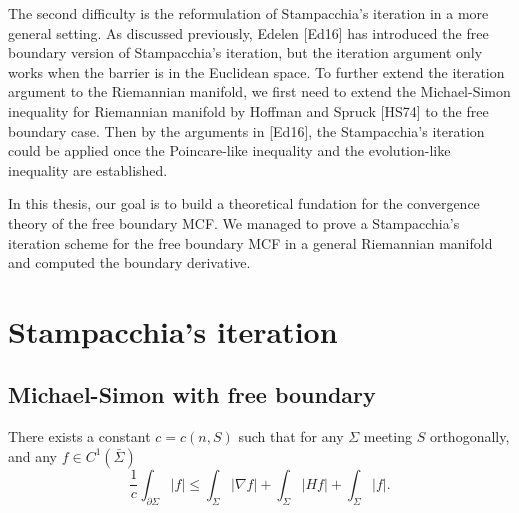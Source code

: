 The second difficulty is the reformulation of Stampacchia's iteration in a more general setting. As discussed previously, Edelen [Ed16] has introduced the free boundary version of Stampacchia's iteration, but the iteration argument only works when the barrier is in the Euclidean space. To further extend the iteration argument to the Riemannian manifold, we first need to extend the Michael-Simon inequality for Riemannian manifold by Hoffman and Spruck [HS74] to the free boundary case. Then by the arguments in [Ed16], the Stampacchia's iteration could be applied once the Poincare-like inequality and the evolution-like inequality are established.

In this thesis, our goal is to build a theoretical fundation for the convergence theory of the free boundary MCF. We managed to prove a Stampacchia's iteration scheme for the free boundary MCF in a general Riemannian manifold and computed the boundary derivative.

\section{Stampacchia's iteration}
\subsection{Michael-Simon with free boundary}

\begin{lemma}\label{BoundaryIntegral}
    There exists a constant $c=c(n,S)$ such that for any $\Sigma $ meeting $S$ orthogonally, and any $f \in C^1(\bar{\Sigma })$ 
    \[
        \frac{1}{c}\int_{\partial \Sigma } \left| f \right| \leq \int_{ \Sigma} \left| \nabla f \right| + \int_{ \Sigma} \left| Hf \right| + \int_{ \Sigma} \left| f \right| .   
    \]
\end{lemma}

